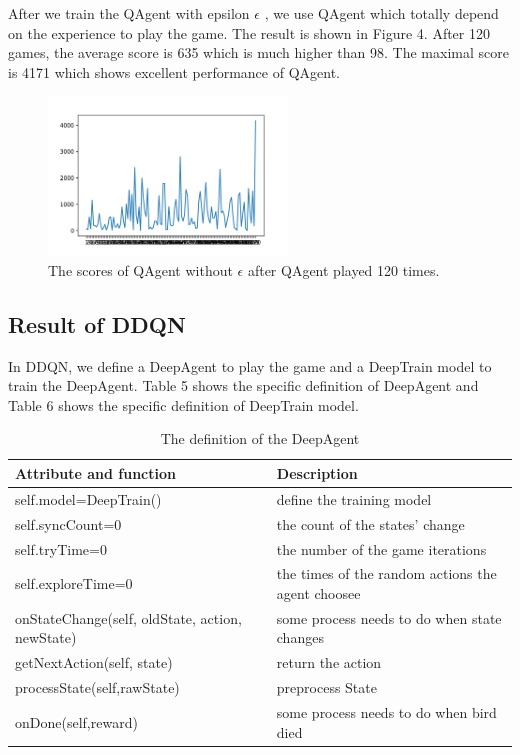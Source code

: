 \documentclass[conference,compsoc]{IEEEtran}
\begin{document}
\indent After we train the QAgent with epsilon ${\epsilon}$ , we use QAgent which totally depend on the experience to play the game. The result is shown in Figure 4.  After 120 games, the average score is 635 which is much higher than 98. The maximal score is 4171 which shows excellent performance of QAgent.

\begin{figure}[!t]
\centering
\includegraphics[width=2.5in]{Qlearn_noEp_result.png}
\caption{The scores of QAgent without ${\epsilon}$ after QAgent played 120 times.}
\label{fig3}
\end{figure}

\subsection{Result of DDQN}
In DDQN, we define a DeepAgent to play the game and a DeepTrain model to train the DeepAgent. Table 5 shows the specific definition of DeepAgent and Table 6 shows the specific definition of DeepTrain model.

\begin{table}[!t]
\renewcommand{\arraystretch}{1.3}
\caption{The definition of the DeepAgent}
\label{table_5}
\centering
\begin{tabular}{|p{110pt}|p{110pt}|}
\hline
Attribute and function & Description\\
\hline
self.model=DeepTrain() & define the training model\\
\hline
self.syncCount=0 & the count of the states’ change\\
\hline
self.tryTime=0 & the number of the game iterations\\
\hline
self.exploreTime=0 & the times of the random actions the agent choosee\\
\hline
onStateChange(self, oldState, action, newState) & some process needs to do when state changes\\
\hline
getNextAction(self, state) & return the action\\
\hline
processState(self,rawState) & preprocess State\\
\hline
onDone(self,reward) & some process needs to do when bird died\\
\hline
\end{tabular}
\end{table}
\end{document}
